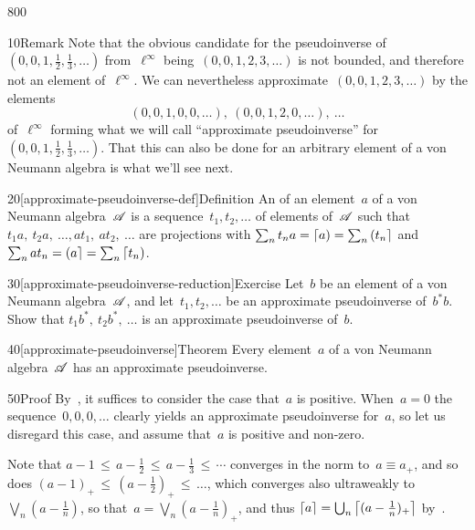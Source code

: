 \begin{parsec}{800}%
\begin{point}{10}{Remark}%
Note that the obvious candidate
for the pseudoinverse of~$(0,0,1,\frac{1}{2},\frac{1}{3},\dotsc)$
from~$\ell^\infty$
being~$(0,0,1,2,3,\dotsc)$
is not bounded,
and therefore not an element of~$\ell^\infty$.
We can nevertheless approximate~$(0,0,1,2,3,\dotsc)$
by the elements
\begin{equation*}
(0,0,1,0,0,\dotsc),\ 
(0,0,1,2,0,\dotsc),\  \dots 
\end{equation*}
of~$\ell^\infty$
forming what we will call ``approximate pseudoinverse'' for 
$(0,0,1,\frac{1}{2},\frac{1}{3},\dotsc)$.
That this can also be done for an arbitrary element
of a von Neumann algebra
is what we'll see next.
\end{point}
\begin{point}{20}[approximate-pseudoinverse-def]{Definition}%
An %
%
of an element~$a$ of a von Neumann algebra~$\mathscr{A}$
is a sequence~$t_1,t_2,\dotsc$
of elements of~$\mathscr{A}$
such that~$t_1a,\ t_2a,\ \dotsc, at_1,\ at_2,\ \dotsc$
are projections with $\sum_n t_na = \left\lceil a\right)=\sum_n \left(t_n\right\rceil$
and~$\sum_n at_n =\left(a\right\rceil=\sum_n \left\lceil t_n\right)$.
\end{point}
\begin{point}{30}[approximate-pseudoinverse-reduction]{Exercise}%
Let~$b$ be an element of a von Neumann algebra~$\mathscr{A}$,
and let~$t_1,t_2,\dotsc$
be an approximate pseudoinverse
of~$b^*b$.
Show that $t_1b^*,\ t_2b^*,\ \dotsc$
is an approximate pseudoinverse of~$b$.
\end{point}
\begin{point}{40}[approximate-pseudoinverse]{Theorem}%
Every element~$a$ of a von Neumann algebra~$\mathscr{A}$
has an approximate pseudoinverse.
\begin{point}{50}{Proof}%
By~,
it suffices to consider the case that~$a$ is positive.
When~$a=0$ the sequence~$0,0,0,\dotsc$
clearly yields an approximate pseudoinverse for~$a$,
so let us disregard this case,
and assume that~$a$ is positive and non-zero.

Note that $a-1 \,\leq\, a-\frac{1}{2}\,\leq\, a - \frac{1}{3}\,\leq\, \dotsb$
converges in the norm to~$a\equiv a_+$,
and so does $(a-1)_+\,\leq\,(a-\frac{1}{2})_+\,\leq\,\dotsc$,
which converges also ultraweakly to~$\bigvee_n(a-\frac{1}{n})$,
so that~$a=\bigvee_n (a-\frac{1}{n})_+$,
and thus $\left\lceil a\right\rceil=\bigcup_n \left\lceil(a-\frac{1}{n})_+\right\rceil$
by~.


\end{point}
\end{point}
\end{parsec}
